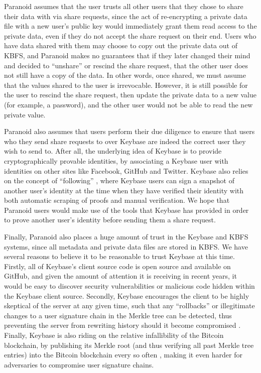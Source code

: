 \documentclass[letterpaper,twocolumn,10pt]{article}
\begin{document}
Paranoid assumes that the user trusts all other users that they chose to share their data with via share requests, since the act of re-encrypting a private data file with a new user's public key would immediately grant them read access to the private data, even if they do not accept the share request on their end. Users who have data shared with them may choose to copy out the private data out of KBFS, and Paranoid makes no guarantees that if they later changed their mind and decided to ``unshare'' or rescind the share request, that the other user does not still have a copy of the data. In other words, once shared, we must assume that the values shared to the user is irrevocable. However, it is still possible for the user to rescind the share request, then update the private data to a new value (for example, a password), and the other user would not be able to read the new private value.

Paranoid also assumes that users perform their due diligence to ensure that users who they send share requests to over Keybase are indeed the correct user they wish to send to. After all, the underlying idea of Keybase is to provide cryptographically provable identities, by associating a Keybase user with identities on other sites like Facebook, GitHub and Twitter. Keybase also relies on the concept of ``following'' \cite{KeybaseFollowing}, where Keybase users can sign a snapshot of another user's identity at the time when they have verified their identity with both automatic scraping of proofs and manual verification. We hope that Paranoid users would make use of the tools that Keybase has provided in order to prove another user's identity before sending them a share request.

Finally, Paranoid also places a huge amount of trust in the Keybase and KBFS systems, since all metadata and private data files are stored in KBFS. We have several reasons to believe it to be reasonable to trust Keybase at this time. Firstly, all of Keybase's client source code is open source and available on GitHub, and given the amount of attention it is receiving in recent years, it would be easy to discover security vulnerabilities or malicious code hidden within the Keybase client source. Secondly, Keybase encourages the client to be highly skeptical of the server at any given time, such that any ``rollbacks'' or illegitimate changes to a user signature chain in the Merkle tree can be detected, thus preventing the server from rewriting history should it become compromised \cite{KeybaseServerSecurity}. Finally, Keybase is also riding on the relative infallibility of the Bitcoin blockchain, by publishing its Merkle root (and thus verifying all past Merkle tree entries) into the Bitcoin blockchain every so often \cite{KeybaseBitcoin}, making it even harder for adversaries to compromise user signature chains.
\end{document}
